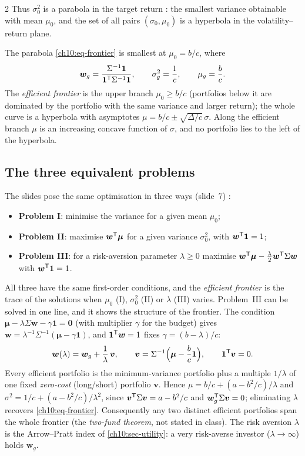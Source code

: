 \begin{paracol}{2}
Thus $\sigma_0^2$ is a parabola in the target return : the smallest variance obtainable
with mean $\mu_0$, and the set of all pairs $(\sigma_0,\mu_0)$ is a hyperbola in the volatility--return plane.

\begin{corollary}\label{ch10:cor-gmv}
The parabola \eqref{ch10:eq-frontier} is smallest at $\mu_0=b/c$, where
\[
  \bm w_g=\frac{\Sigma^{-1}\bm 1}{\bm 1^{\mathsf T}\Sigma^{-1}\bm 1},\qquad \sigma_g^2=\frac1c,\qquad \mu_g=\frac bc .
\]
The \emph{efficient frontier} is the upper branch $\mu_0\ge b/c$ (portfolios below it are dominated by the
portfolio with the same variance and larger return); the whole curve is a hyperbola with asymptotes
$\mu=b/c\pm\sqrt{\Delta/c}\,\sigma$. Along the efficient branch $\mu$ is an increasing concave function of $\sigma$, and no portfolio lies to the left of the hyperbola.
\end{corollary}

\subsection{The three equivalent problems}
The slides pose the same optimisation in three ways (slide~7) :
\begin{itemize}
  \item \textbf{Problem I}: minimise the variance for a given mean $\mu_0$;
  \item \textbf{Problem II}: maximise $\bm w^{\mathsf T}\bm\mu$ for a given variance $\sigma_0^2$, with $\bm w^{\mathsf T}\bm 1=1$;
  \item \textbf{Problem III}: for a risk-aversion parameter $\lambda\ge0$ maximise
        $\bm w^{\mathsf T}\bm\mu-\frac\lambda2\bm w^{\mathsf T}\Sigma\bm w$ with $\bm w^{\mathsf T}\bm 1=1$.
\end{itemize}
All three have the same first-order conditions, and the \emph{efficient frontier} is the trace of the solutions
when $\mu_0$ (I), $\sigma_0^2$ (II) or $\lambda$ (III) varies. Problem~III can be solved in one line, and it shows the
structure of the frontier. The condition $\bm\mu-\lambda\Sigma\bm w-\gamma\bm 1=\bm 0$ (with multiplier $\gamma$
for the budget) gives $\bm w=\lambda^{-1}\Sigma^{-1}(\bm\mu-\gamma\bm 1)$, and $\bm 1^{\mathsf T}\bm w=1$ fixes $\gamma=(b-\lambda)/c$:
\begin{equation}\label{ch10:eq-twofund}
  \bm w(\lambda)=\bm w_g+\frac1\lambda\,\bm v,\qquad \bm v=\Sigma^{-1}\Bigl(\bm\mu-\frac bc\bm 1\Bigr),\qquad
  \bm 1^{\mathsf T}\bm v=0 .
\end{equation}
Every efficient portfolio is the minimum-variance portfolio plus a multiple $1/\lambda$ of one fixed
\emph{zero-cost} (long/short) portfolio $\bm v$. Hence $\mu=b/c+(a-b^2/c)/\lambda$ and
$\sigma^2=1/c+(a-b^2/c)/\lambda^2$, since $\bm v^{\mathsf T}\Sigma\bm v=a-b^2/c$ and $\bm w_g^{\mathsf T}\Sigma\bm v=0$; eliminating $\lambda$
recovers \eqref{ch10:eq-frontier}. Consequently any two distinct efficient portfolios span the whole frontier (the
\emph{two-fund theorem}, not stated in class). The risk aversion $\lambda$ is the Arrow--Pratt index of
\cref{ch10:sec-utility}: a very risk-averse investor ($\lambda\to\infty$) holds $\bm w_g$.


\end{paracol}
